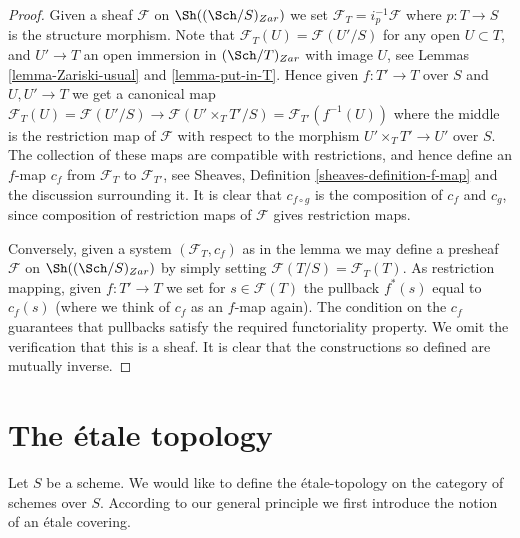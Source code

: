\begin{proof}
Given a sheaf $\mathcal{F}$ on $\Sh((\Sch/S)_{Zar})$
we set $\mathcal{F}_T = i_p^{-1}\mathcal{F}$ where $p : T \to S$
is the structure morphism. Note that
$\mathcal{F}_T(U) = \mathcal{F}(U'/S)$ for any open $U \subset T$,
and $U' \to T$ an open immersion in $(\Sch/T)_{Zar}$
with image $U$, see Lemmas \ref{lemma-Zariski-usual} and \ref{lemma-put-in-T}.
Hence given $f : T' \to T$ over $S$ and $U, U' \to T$ we get a canonical
map $\mathcal{F}_T(U) = \mathcal{F}(U'/S) \to \mathcal{F}(U'\times_T T'/S)
= \mathcal{F}_{T'}(f^{-1}(U))$ where the middle is the restriction map
of $\mathcal{F}$ with respect to the morphism
$U' \times_T T' \to U'$ over $S$. The collection of these maps are
compatible with restrictions, and hence define an $f$-map $c_f$
from $\mathcal{F}_T$ to $\mathcal{F}_{T'}$, see
Sheaves, Definition \ref{sheaves-definition-f-map} and the discussion
surrounding it. It is clear that $c_{f \circ g}$ is the composition of
$c_f$ and $c_g$, since composition of restriction maps of $\mathcal{F}$
gives restriction maps.

\medskip\noindent
Conversely, given a system $(\mathcal{F}_T, c_f)$ as in the lemma
we may define a presheaf $\mathcal{F}$ on $\Sh((\Sch/S)_{Zar})$
by simply setting $\mathcal{F}(T/S) = \mathcal{F}_T(T)$. As restriction
mapping, given $f : T' \to T$ we set for $s \in \mathcal{F}(T)$
the pullback $f^*(s)$ equal to $c_f(s)$ (where we think of $c_f$ as
an $f$-map again). The condition on the $c_f$ guarantees that
pullbacks satisfy the required functoriality property.
We omit the verification that this is a sheaf.
It is clear that the constructions so defined are mutually inverse.
\end{proof}























\section{The \'etale topology}
\label{section-etale}

\noindent
Let $S$ be a scheme. We would like to define the \'etale-topology on
the category of schemes over $S$. According to our general principle
we first introduce the notion of an \'etale covering.

